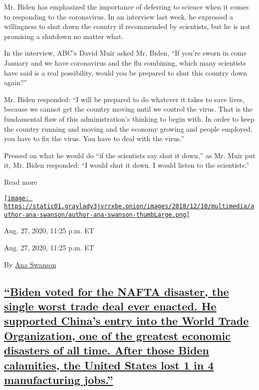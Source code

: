 Mr. Biden has emphasized the importance of deferring to science when it
comes to responding to the coronavirus. In an interview last week, he
expressed a willingness to shut down the country if recommended by
scientists, but he is not promising a shutdown no matter what.

In the interview, ABC's David Muir asked Mr. Biden, ``If you're sworn in
come January and we have coronavirus and the flu combining, which many
scientists have said is a real possibility, would you be prepared to
shut this country down again?''

Mr. Biden responded: ``I will be prepared to do whatever it takes to
save lives, because we cannot get the country moving until we control
the virus. That is the fundamental flaw of this administration's
thinking to begin with. In order to keep the country running and moving
and the economy growing and people employed, you have to fix the virus.
You have to deal with the virus.''

Pressed on what he would do ``if the scientists say shut it down,'' as
Mr. Muir put it, Mr. Biden responded: ``I would shut it down. I would
listen to the scientists.''

Read more

\href{https://www.nytimes3xbfgragh.onion/by/ana-swanson}{\texttt{[image: https://static01.graylady3jvrrxbe.onion/images/2018/12/10/multimedia/author-ana-swanson/author-ana-swanson-thumbLarge.png]}}

Aug. 27, 2020, 11:25 p.m. ET

Aug. 27, 2020, 11:25 p.m. ET

By \href{https://www.nytimes3xbfgragh.onion/by/ana-swanson}{Ana Swanson}

\hypertarget{biden-voted-for-the-nafta-disaster-the-single-worst-trade-deal-ever-enacted-he-supported-chinas-entry-into-the-world-trade-organization-one-of-the-greatest-economic-disasters-of-all-time-after-those-biden-calamities-the-united-states-lost-1-in-4-manufacturing-jobs}{%
\subsection{\texorpdfstring{\protect\hyperlink{biden-voted-for-the-nafta-disaster-the-single-worst-trade-deal-ever-enacted-he-supported-chinas-entry-into-the-world-trade-organ}{``Biden
voted for the NAFTA disaster, the single worst trade deal ever enacted.
He supported China's entry into the World Trade Organization, one of the
greatest economic disasters of all time. After those Biden calamities,
the United States lost 1 in 4 manufacturing
jobs.''}}{``Biden voted for the NAFTA disaster, the single worst trade deal ever enacted. He supported China's entry into the World Trade Organization, one of the greatest economic disasters of all time. After those Biden calamities, the United States lost 1 in 4 manufacturing jobs.''}}\label{biden-voted-for-the-nafta-disaster-the-single-worst-trade-deal-ever-enacted-he-supported-chinas-entry-into-the-world-trade-organization-one-of-the-greatest-economic-disasters-of-all-time-after-those-biden-calamities-the-united-states-lost-1-in-4-manufacturing-jobs}}


